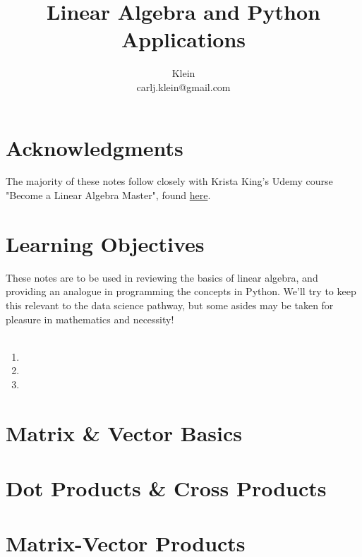 \documentclass{article}
\begin{document}
	\title{Linear Algebra and Python Applications}
	\author{Klein \\ carlj.klein@gmail.com}
	\date{}
	\maketitle

\section{Acknowledgments}
The majority of these notes follow closely with Krista King's Udemy course "Become a Linear Algebra Master", found \href{https://www.udemy.com/course/linear-algebra-course/}{here}.

\section{Learning Objectives}
These notes are to be used in reviewing the basics of linear algebra, and providing an analogue in programming the concepts in Python. We'll try to keep this relevant to the data science pathway, but some asides may be taken for pleasure in mathematics and necessity!
\\\\

\begin{enumerate}
	\item {}
	\item {}
	\item {}
\end{enumerate}

\section{Matrix \& Vector Basics}\label{sec:concept1}


\section{Dot Products \& Cross Products}\label{sec:concept2}


\section{Matrix-Vector Products}\label{sec:concept3}

\end{document}
